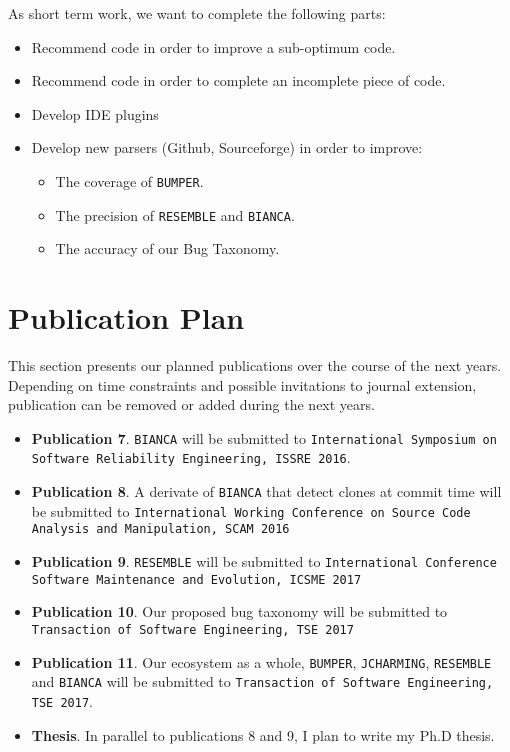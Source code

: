As short term work, we want to complete the following parts:

\begin{itemize}
	\item Recommend code in order to improve a sub-optimum code.
	\item Recommend code in order to complete an incomplete piece of code.
	\item Develop IDE plugins
	\item Develop new parsers (Github, Sourceforge) in order to improve:
	\begin{itemize}
		\item The coverage of {\tt BUMPER}.
		\item The precision of {\tt RESEMBLE} and {\tt BIANCA}.
		\item The accuracy of our Bug Taxonomy.
	\end{itemize}
\end{itemize}

\section{Publication Plan\label{sec:publication-plan}}

This section presents our planned publications over the course of the next years.
Depending on time constraints and possible invitations to journal extension, publication can be removed or added during the next years.

\begin{itemize}

	\item {\bf Publication 7}. {\tt BIANCA} will be submitted to {\tt International Symposium on Software Reliability Engineering, ISSRE 2016}.
	\item {\bf Publication 8}. A derivate of {\tt BIANCA} that detect clones at commit time will be submitted to {\tt International Working Conference on Source Code Analysis and Manipulation, SCAM 2016}
	\item {\bf Publication 9}. {\tt RESEMBLE} will be submitted to {\tt International Conference Software Maintenance and Evolution, ICSME 2017}
	\item {\bf Publication 10}. Our proposed bug taxonomy will be submitted to {\tt Transaction of Software Engineering, TSE 2017}
	\item {\bf Publication 11}. Our ecosystem as a whole, {\tt BUMPER}, {\tt JCHARMING}, {\tt RESEMBLE} and {\tt BIANCA} will be submitted to {\tt Transaction of Software Engineering, TSE 2017}.
	\item {\bf Thesis}. In parallel to publications 8 and 9, I plan to write my Ph.D thesis.
\end{itemize}
